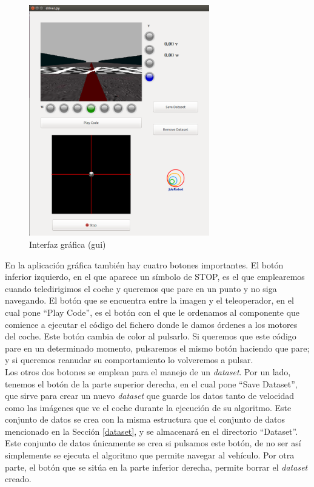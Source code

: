 \begin{figure}[H]
  \begin{center}
    \includegraphics[width=0.7\textwidth]{figures/Infraestructura/gui.png}
		\caption{Interfaz gráfica (\acrshort{gui})}
		\label{fig.gui}
		\end{center}
\end{figure}


En la aplicación gráfica también hay cuatro botones importantes. El botón inferior  izquierdo, en el que aparece un símbolo de STOP, es el que emplearemos cuando teledirigimos el coche y queremos que pare en un punto y no siga navegando. El botón que se encuentra entre la imagen y el teleoperador, en el cual pone ``Play Code'', es el botón con el que le ordenamos al componente que comience a ejecutar el código del fichero donde le damos órdenes a los motores del coche. Este botón cambia de color al pulsarlo. Si queremos que este código pare en un determinado momento, pulsaremos el mismo botón haciendo que pare; y si queremos reanudar su comportamiento lo volveremos a pulsar.\\

Los otros dos botones se emplean para el manejo de un \textit{dataset}. Por un lado, tenemos el botón de la parte superior derecha, en el cual pone ``Save Dataset'', que sirve para crear un nuevo \textit{dataset} que guarde los datos tanto de velocidad como las imágenes que ve el coche durante la ejecución de su algoritmo. Este conjunto de datos se crea con la misma estructura que el conjunto de datos mencionado en la Sección \ref{dataset}, y se almacenará en el directorio ``Dataset''. Este conjunto de datos únicamente se crea si pulsamos este botón, de no ser así simplemente se ejecuta el algoritmo que permite navegar al vehículo. Por otra parte, el botón que se sitúa en la parte inferior derecha, permite borrar el \textit{dataset} creado.\\


